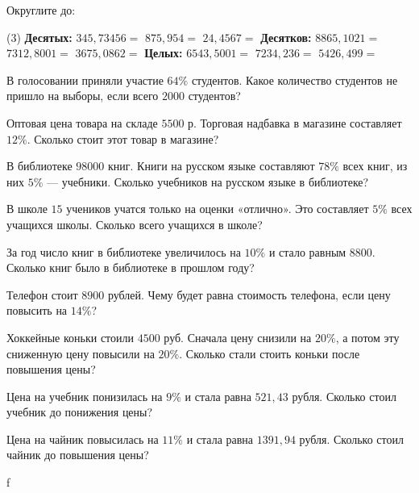 \begin{class}[number=2]
	\begin{listofex}
		\item Округлите до:
		\begin{tasks}(3)
			\task[] \textbf{Десятых:}
			\task[]
			\task[]
			\task \( 345,73456 = \)
			\task \( 875, 954 = \)
			\task \( 24,4567 = \)
			\task[] \textbf{Десятков:}
			\task[]
			\task[]
			\task \( 8865,1021 = \)
			\task \( 7312,8001 = \)
			\task \( 3675,0862 = \)
			\task[] \textbf{Целых:}
			\task[]
			\task[]
			\task \( 6543,5001 = \)
			\task \( 7234,236 = \)
			\task \( 5426,499 = \)
		\end{tasks}
		\item  В голосовании приняли участие \( 64\% \) студентов. Какое количество студентов не пришло на выборы, если всего \( 2000 \) студентов? 
		\item Оптовая цена товара на складе \( 5500 \) р. Торговая надбавка в магазине составляет \( 12\% \). 
		Сколько стоит этот товар в магазине?  
		\item В библиотеке \( 98000  \) книг. Книги на русском языке составляют \( 78\% \) всех книг, из
		них \( 5\% \) --- учебники. Сколько учебников на русском языке в библиотеке?
		\item В школе \( 15 \) учеников учатся только на оценки «отлично». Это составляет \( 5\% \) всех учащихся
		школы. Сколько всего учащихся в школе? 
		\item За год число книг в библиотеке увеличилось на \( 10\% \) и стало равным \( 8800 \). Сколько книг
		было в библиотеке в прошлом году?
		\item Телефон стоит \( 8900 \) рублей. Чему будет равна стоимость телефона, если цену повысить на \( 14\% \)?
		\item Хоккейные коньки стоили \( 4500 \) руб. Сначала цену снизили на \( 20\% \), а потом эту сниженную цену повысили на \( 20\% \). Сколько стали стоить коньки после повышения цены?
		\item Цена на учебник понизилась на \( 9\% \) и стала равна \( 521,43  \) рубля. Сколько стоил учебник до понижения цены?
		\item Цена на чайник повысилась на \( 11\% \) и стала равна \( 1391,94  \) рубля. Сколько стоил чайник до повышения цены?
	\end{listofex}
\end{class}

\begin{homework}[number=1]
	\begin{listofex}
		\item f
	\end{listofex}
\end{homework}

